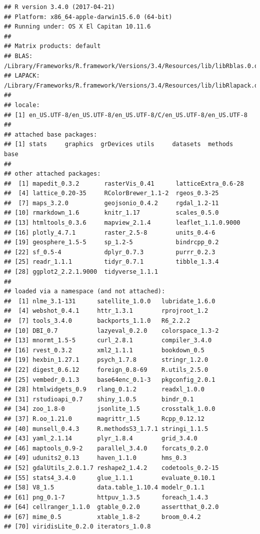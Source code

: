 \documentclass[]{book}
\theoremstyle{definition}
\theoremstyle{definition}
\theoremstyle{definition}
\theoremstyle{remark}
\begin{document}
\begin{verbatim}
## R version 3.4.0 (2017-04-21)
## Platform: x86_64-apple-darwin15.6.0 (64-bit)
## Running under: OS X El Capitan 10.11.6
## 
## Matrix products: default
## BLAS: /Library/Frameworks/R.framework/Versions/3.4/Resources/lib/libRblas.0.dylib
## LAPACK: /Library/Frameworks/R.framework/Versions/3.4/Resources/lib/libRlapack.dylib
## 
## locale:
## [1] en_US.UTF-8/en_US.UTF-8/en_US.UTF-8/C/en_US.UTF-8/en_US.UTF-8
## 
## attached base packages:
## [1] stats     graphics  grDevices utils     datasets  methods   base     
## 
## other attached packages:
##  [1] mapedit_0.3.2       rasterVis_0.41      latticeExtra_0.6-28
##  [4] lattice_0.20-35     RColorBrewer_1.1-2  rgeos_0.3-25       
##  [7] maps_3.2.0          geojsonio_0.4.2     rgdal_1.2-11       
## [10] rmarkdown_1.6       knitr_1.17          scales_0.5.0       
## [13] htmltools_0.3.6     mapview_2.1.4       leaflet_1.1.0.9000 
## [16] plotly_4.7.1        raster_2.5-8        units_0.4-6        
## [19] geosphere_1.5-5     sp_1.2-5            bindrcpp_0.2       
## [22] sf_0.5-4            dplyr_0.7.3         purrr_0.2.3        
## [25] readr_1.1.1         tidyr_0.7.1         tibble_1.3.4       
## [28] ggplot2_2.2.1.9000  tidyverse_1.1.1    
## 
## loaded via a namespace (and not attached):
##  [1] nlme_3.1-131      satellite_1.0.0   lubridate_1.6.0  
##  [4] webshot_0.4.1     httr_1.3.1        rprojroot_1.2    
##  [7] tools_3.4.0       backports_1.1.0   R6_2.2.2         
## [10] DBI_0.7           lazyeval_0.2.0    colorspace_1.3-2 
## [13] mnormt_1.5-5      curl_2.8.1        compiler_3.4.0   
## [16] rvest_0.3.2       xml2_1.1.1        bookdown_0.5     
## [19] hexbin_1.27.1     psych_1.7.8       stringr_1.2.0    
## [22] digest_0.6.12     foreign_0.8-69    R.utils_2.5.0    
## [25] vembedr_0.1.3     base64enc_0.1-3   pkgconfig_2.0.1  
## [28] htmlwidgets_0.9   rlang_0.1.2       readxl_1.0.0     
## [31] rstudioapi_0.7    shiny_1.0.5       bindr_0.1        
## [34] zoo_1.8-0         jsonlite_1.5      crosstalk_1.0.0  
## [37] R.oo_1.21.0       magrittr_1.5      Rcpp_0.12.12     
## [40] munsell_0.4.3     R.methodsS3_1.7.1 stringi_1.1.5    
## [43] yaml_2.1.14       plyr_1.8.4        grid_3.4.0       
## [46] maptools_0.9-2    parallel_3.4.0    forcats_0.2.0    
## [49] udunits2_0.13     haven_1.1.0       hms_0.3          
## [52] gdalUtils_2.0.1.7 reshape2_1.4.2    codetools_0.2-15 
## [55] stats4_3.4.0      glue_1.1.1        evaluate_0.10.1  
## [58] V8_1.5            data.table_1.10.4 modelr_0.1.1     
## [61] png_0.1-7         httpuv_1.3.5      foreach_1.4.3    
## [64] cellranger_1.1.0  gtable_0.2.0      assertthat_0.2.0 
## [67] mime_0.5          xtable_1.8-2      broom_0.4.2      
## [70] viridisLite_0.2.0 iterators_1.0.8
\end{verbatim}
\end{document}
